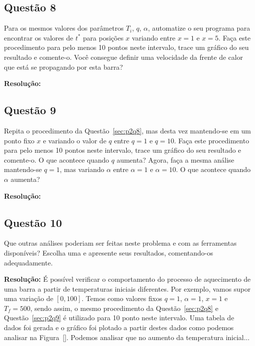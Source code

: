 \documentclass[12pt]{article}
\begin{document}
\subsection*{Questão 8}
\label{sec:p2q8}
Para os mesmos valores dos parâmetros $T_{i}$, $q$, $\alpha$, automatize o seu programa para encontrar os valores de $t^{*}$ para posições $x$ variando entre $x = 1$ e $x = 5$. Faça este procedimento para pelo menos 10 pontos neste intervalo, trace um gráfico do seu resultado e comente-o. Você consegue definir uma velocidade da frente de calor que está se propagando por esta barra?

\textbf{Resolução:}

\subsection*{Questão 9}
\label{sec:p2q9}
Repita o procedimento da Questão~\ref{sec:p2q8}, mas desta vez mantendo-se em um ponto fixo $x$ e variando o valor de $q$ entre $q = 1$ e $q = 10$. Faça este procedimento para pelo menos 10 pontos neste intervalo, trace um gráfico do seu resultado e comente-o. O que acontece quando $q$ aumenta? Agora, faça a mesma análise mantendo-se $q = 1$, mas variando $\alpha$ entre $\alpha = 1$ e $\alpha = 10$. O que acontece quando $\alpha$ aumenta?

\textbf{Resolução:}

\subsection*{Questão 10}
\label{sec:p2q10}
Que outras análises poderiam ser feitas neste problema e com as ferramentas disponíveis? Escolha uma e apresente seus resultados, comentando-os adequadamente.

\textbf{Resolução:}
É possível verificar o comportamento do processo de aquecimento de uma barra a partir de temperaturas iniciais diferentes. Por exemplo, vamos supor uma variação de $[0, 100]$. Temos como valores fixos $q = 1$, $\alpha = 1$, $x = 1$ e $T_{f} = 500$, sendo assim, o mesmo procedimento da Questão~\ref{sec:p2q8} e  Questão~\ref{sec:p2q9} é utilizado para 10 ponto neste intervalo. Uma tabela de dados foi gerada e o gráfico foi plotado a partir destes dados como podemos analisar na Figura~\ref{}. Podemos analisar que no aumento da temperatura inicial...
\end{document}
